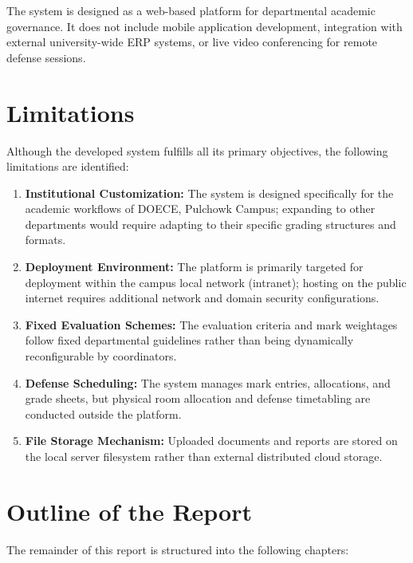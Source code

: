 \documentclass[12pt,a4paper]{report}
\begin{document}
The system is designed as a web-based platform for departmental academic governance. It does not include mobile application development, integration with external university-wide ERP systems, or live video conferencing for remote defense sessions.

\section{Limitations}
Although the developed system fulfills all its primary objectives, the following limitations are identified:

\begin{enumerate}
  \item \textbf{Institutional Customization:} The system is designed specifically for the academic workflows of DOECE, Pulchowk Campus; expanding to other departments would require adapting to their specific grading structures and formats.
  
  \item \textbf{Deployment Environment:} The platform is primarily targeted for deployment within the campus local network (intranet); hosting on the public internet requires additional network and domain security configurations.
  
  \item \textbf{Fixed Evaluation Schemes:} The evaluation criteria and mark weightages follow fixed departmental guidelines rather than being dynamically reconfigurable by coordinators.
  
  \item \textbf{Defense Scheduling:} The system manages mark entries, allocations, and grade sheets, but physical room allocation and defense timetabling are conducted outside the platform.
  
  \item \textbf{File Storage Mechanism:} Uploaded documents and reports are stored on the local server filesystem rather than external distributed cloud storage.
\end{enumerate}

\section{Outline of the Report}
The remainder of this report is structured into the following chapters:
\end{document}
